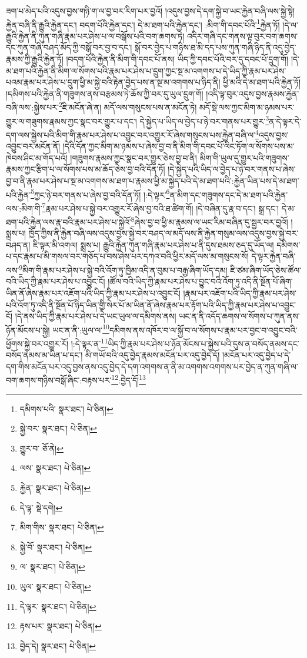 ཟག་པ་མེད་པའི་འདུས་བྱས་གཉི་ག་ལ་བྱ་བར་རིག་པར་བྱའོ། །འདུས་བྱས་དེ་དག་སྐྱེ་བ་ཡང་རྐྱེན་བཞི་ལས་སྐྱེ་སྟེ། རྐྱེན་བཞི་ནི་རྒྱུའི་རྐྱེན་དང་། བདག་པོའི་རྐྱེན་དང་། དེ་མ་ཐག་པའི་རྐྱེན་དང་། :མིག་གི་དབང་པོའི་\footnote{དམིགས་པའི་  སྣར་ཐང་།  པེ་ཅིན། }རྐྱེན་ཏོ། །དེ་ལ་རྒྱུའི་རྐྱེན་ནི་ཀུན་གཞི་རྣམ་པར་ཤེས་པ་ལ་བསྒོས་པའི་བག་ཆགས་ཏེ། འདིར་གཞི་དང་གནས་ལྟ་བུར་བག་ཆགས་དང་ཀུན་གཞི་བཤད་མོད་ཀྱི་བསྒོ་བར་བྱ་བ་དང་། སྒོ་བར་བྱེད་པ་གཉིས་ཐ་མི་དད་པས་ཀུན་གཞི་ཉིད་ནི་འདུ་བྱེད་རྣམས་ཀྱི་རྒྱུའི་རྐྱེན་ཏོ། །བདག་པོའི་རྐྱེན་ནི་མིག་གི་དབང་པོ་ནས། ཡིད་ཀྱི་དབང་པོའི་བར་དུ་དབང་པོ་དྲུག་གོ། །དེ་མ་ཐག་པའི་རྐྱེན་ནི་མིག་ལ་སོགས་པའི་རྣམ་པར་ཤེས་པ་དྲུག་ཀྱང་སྔ་མ་འགགས་པ་དེ་ཡིད་ཀྱི་རྣམ་པར་ཤེས་པའམ་རྣམ་པར་ཤེས་པ་དྲུག་ཕྱི་མ་སྐྱེ་བའི་རྟེན་བྱེད་པས་ན་སྔ་མ་འགགས་པ་ཉིད་ནི། ཕྱི་མའི་དེ་མ་ཐག་པའི་རྐྱེན་ཏོ། །དམིགས་པའི་རྐྱེན་ནི་གཟུགས་ནས་བརྩམས་ཏེ་ཆོས་ཀྱི་བར་དུ་ཡུལ་དྲུག་གོ། །འདི་ལྟ་བུར་འདུས་བྱས་རྣམས་རྐྱེན་བཞི་ལས་:སྐྱེས་པར་\footnote{སྐྱེ་བར་  སྣར་ཐང་།  པེ་ཅིན། }ཇི་མངོན་ཞེ་ན། མདོ་ལས་གསུངས་པས་ན་མངོན་ཏེ། མདོ་སྡེ་ལས་ཀྱང་མིག་མ་ཉམས་པར་གྱུར་ལ་གཟུགས་རྣམས་ཀྱང་སྣང་བར་གྱུར་པ་དང་། དེ་སྐྱེད་པ་ཡིད་ལ་བྱེད་པ་ཉེ་བར་གནས་པར་གྱུར་\footnote{གྱུར་བ་  ཅོ་ནེ། }ན་དེ་ལྟར་དེ་དག་ལས་སྐྱེས་པའི་མིག་གི་རྣམ་པར་ཤེས་པ་འབྱུང་བར་འགྱུར་རོ་ཞེས་གསུངས་པས་རྐྱེན་བཞི་ལ་\footnote{ལས་  སྣར་ཐང་།  པེ་ཅིན། }འདུས་བྱས་འབྱུང་བར་མངོན་ནོ། །དེའི་དོན་ཀྱང་མིག་མ་ཉམས་པ་ཞེས་བྱ་བ་ནི་མིག་གི་དབང་པོ་ལིང་ཏོག་ལ་སོགས་པས་མ་ཁེབས་ཤིང་མ་གོད་པའོ། །གཟུགས་རྣམས་ཀྱང་སྣང་བར་གྱུར་ཅེས་བྱ་བ་ནི། མིག་གི་ཡུལ་དུ་གྱུར་པའི་གཟུགས་རྣམས་ཀྱང་རྩིག་པ་ལ་སོགས་པས་མ་ཆོད་ཅེས་བྱ་བའི་དོན་ཏོ། །དེ་སྐྱེད་པའི་ཡིད་ལ་བྱེད་པ་ཉེ་བར་གནས་པ་ཞེས་བྱ་བ་ནི་རྣམ་པར་ཤེས་པ་སྔ་མ་འགགས་མ་ཐག་པ་རྣམས་ཕྱི་མ་སྐྱེད་པའི་དེ་མ་ཐག་པའི་:རྐྱེན་ཡིན་པས་དེ་མ་ཐག་པའི་རྐྱེན་\footnote{རྐྱེན་  སྣར་ཐང་།  པེ་ཅིན། }ཀྱང་ཉེ་བར་གནས་པ་ཞེས་བྱ་བའི་དོན་ཏོ། །:དེ་ལྟར་\footnote{དེ་ལྟ་  སྡེ་དགེ། }ན་མིག་དང་གཟུགས་དང་དེ་མ་ཐག་པའི་རྐྱེན་ལས་:མིག་གི་\footnote{མིག་གིས་  སྣར་ཐང་།  པེ་ཅིན། }རྣམ་པར་ཤེས་པ་སྐྱེ་བར་འགྱུར་རོ་ཞེས་བྱ་བའི་ཐ་ཚིག་གོ། །དེ་བཞིན་དུ་རྣ་བ་དང་། སྒྲ་དང་། དེ་མ་ཐག་པའི་རྐྱེན་ལས་རྣ་བའི་རྣམ་པར་ཤེས་པ་སྐྱེའོ་\footnote{སྐྱེ་བོ་  སྣར་ཐང་།  པེ་ཅིན། }ཞེས་བྱ་བ་ཕྱི་མ་རྣམས་ལ་ཡང་རིམ་བཞིན་དུ་སྦྱར་བར་བྱའོ། །སྨྲས་པ། ཁྱོད་ཀྱིས་ནི་རྐྱེན་བཞི་ལས་འདུས་བྱས་སྐྱེ་བར་བཤད་ལ་མདོ་ལས་ནི་རྐྱེན་གསུམ་ལས་འདུས་བྱས་སྐྱེ་བར་བཤད་ན། ཇི་ལྟར་མི་འགལ། སྨྲས་པ། རྒྱུའི་རྐྱེན་ཀུན་གཞི་རྣམ་པར་ཤེས་པ་ནི་དུས་ཐམས་ཅད་དུ་ཡོད་ལ། དམིགས་པ་དང་རྣམ་པ་མི་གསལ་བར་གཅོད་པ་བས་ཤེས་པར་དཀའ་བའི་ཕྱིར་མདོ་ལས་མ་གསུངས་སོ། དེ་ལྟར་རྐྱེན་བཞི་ལས་\footnote{ལ་  སྣར་ཐང་།  པེ་ཅིན། }མིག་གི་རྣམ་པར་ཤེས་པ་སྐྱེ་བའི་འོག་ཏུ་ཁྱིམ་འདི་ན་བུམ་པ་བརྒྱ་ཞིག་ཡོད་དམ། ཇི་ཙམ་ཞིག་ཡོད་ཅེས་ཚོལ་བའི་ཡིད་ཀྱི་རྣམ་པར་ཤེས་པ་འབྱུང་ངོ། །ཚོལ་བའི་ཡིད་ཀྱི་རྣམ་པར་ཤེས་པ་བྱུང་བའི་འོག་ཏུ་འདི་ནི་སྔོན་པོ་ཞིག་ཡིན་ནོ་ཞེས་རྣམ་པར་འཇོག་པའི་ཡིད་ཀྱི་རྣམ་པར་ཤེས་པ་འབྱུང་ངོ། །རྣམ་པར་འཇོག་པའི་ཡིད་ཀྱི་རྣམ་པར་ཤེས་པའི་འོག་ཏུ་འདི་ནི་སྔོན་པོ་ཉིད་ཡིན་གྱི་སེར་པོ་མ་ཡིན་ནོ་ཞེས་རྣམ་པར་རྟོག་པའི་ཡིད་ཀྱི་རྣམ་པར་ཤེས་པ་འབྱུང་ངོ། །དེ་ནས་ཡིད་ཀྱི་རྣམ་པར་ཤེས་པ་དེ་ཡང་ཡུལ་ལ་དམིགས་ནས། ཡང་ན་ནི་འདོད་ཆགས་ལ་སོགས་པ་ཀུན་ནས་ཉོན་མོངས་པ་སྐྱེ། ཡང་ན་ནི་:ཡུལ་ལ་\footnote{ཡུལ་  སྣར་ཐང་།  པེ་ཅིན། }དམིགས་ནས་འཁོར་བ་ལ་སྐྱོ་བ་ལ་སོགས་པ་རྣམ་པར་བྱང་བ་འབྱུང་བའི་ཕྱོགས་སྐྱེ་བར་འགྱུར་རོ། །:དེ་ལྟར་ན་\footnote{དེ་ལྟར་  སྣར་ཐང་།  པེ་ཅིན། }ཡིད་ཀྱི་རྣམ་པར་ཤེས་པ་ཉོན་མོངས་པ་སྐྱེས་པའི་དུས་ན་བསོད་ནམས་དང་བསོད་ནམས་མ་ཡིན་པ་དང་། མི་གཡོ་བའི་འདུ་བྱེད་རྣམས་མངོན་པར་འདུ་བྱེད་དོ། །མངོན་པར་འདུ་བྱེད་པ་དེ་དག་གིས་མངོན་པར་འདུ་བྱས་ནས་འདུ་བྱེད་དེ་དག་འགགས་ན་ནི་མ་འགགས་འགགས་པར་བྱེད་ན་ཀུན་གཞི་ལ་བག་ཆགས་གཉིས་བསྒོ་ཞིང་:བརྟས་པར་\footnote{རྟས་པར་  སྣར་ཐང་།  པེ་ཅིན། }:བྱེད་དོ།\footnote{བྱེད་དེ།  སྣར་ཐང་།  པེ་ཅིན། } 